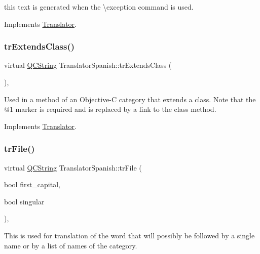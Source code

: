 this text is generated when the \textbackslash{}exception command is used. 

Implements \mbox{\hyperlink{class_translator}{Translator}}.

\mbox{\label{class_translator_spanish_a3d059858b06ec8d1c10481bbf52057cb}} 
\subsubsection{\texorpdfstring{trExtendsClass()}{trExtendsClass()}}
{\footnotesize\ttfamily virtual \mbox{\hyperlink{class_q_c_string}{Q\+C\+String}} Translator\+Spanish\+::tr\+Extends\+Class (\begin{DoxyParamCaption}{ }\end{DoxyParamCaption})\hspace{0.3cm}{\ttfamily [inline]}, {\ttfamily [virtual]}}

Used in a method of an Objective-\/C category that extends a class. Note that the @1 marker is required and is replaced by a link to the class method. 

Implements \mbox{\hyperlink{class_translator}{Translator}}.

\mbox{\label{class_translator_spanish_a65c5cfb79b0aac0540d012f5ce47bd84}} 
\subsubsection{\texorpdfstring{trFile()}{trFile()}}
{\footnotesize\ttfamily virtual \mbox{\hyperlink{class_q_c_string}{Q\+C\+String}} Translator\+Spanish\+::tr\+File (\begin{DoxyParamCaption}\item[{bool}]{first\+\_\+capital,  }\item[{bool}]{singular }\end{DoxyParamCaption})\hspace{0.3cm}{\ttfamily [inline]}, {\ttfamily [virtual]}}

This is used for translation of the word that will possibly be followed by a single name or by a list of names of the category. 

